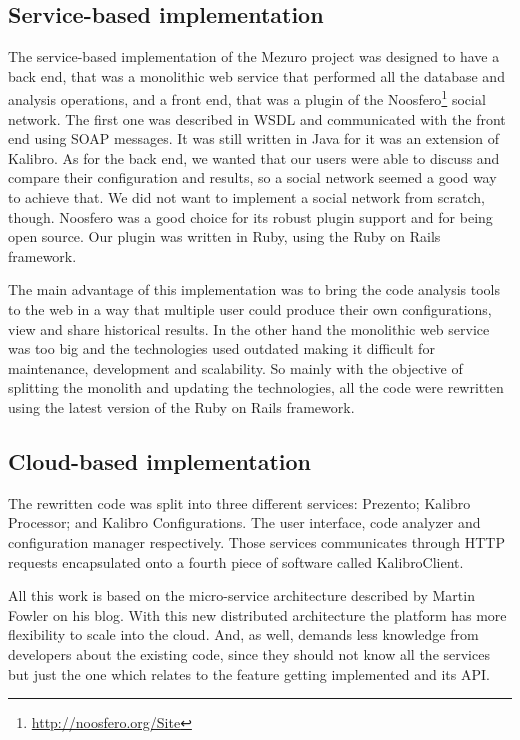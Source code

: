 \subsection{Service-based implementation}
\label{subsec:service-based-implementation}

The service-based implementation of the Mezuro project was designed to have a back end, that was a monolithic web service that performed all the database and analysis operations, and a front end, that was a plugin of the Noosfero\footnote{\url{http://noosfero.org/Site}} social network. The first one was described in WSDL and communicated with the front end using SOAP messages. It was still written in Java for it was an extension of Kalibro. As for the back end, we wanted that our users were able to discuss and compare their configuration and results, so a social network seemed a good way to achieve that. We did not want to implement a social network from scratch, though. Noosfero was a good choice for its robust plugin support and for being open source. Our plugin was written in Ruby, using the Ruby on Rails framework.

The main advantage of this implementation was to bring the code analysis tools to the web in a way that multiple user could produce their own configurations, view and share historical results. In the other hand the monolithic web service was too big and the technologies used outdated making it difficult for maintenance, development and scalability. So mainly with the objective of splitting the monolith and updating the technologies, all the code were rewritten using the latest version of the Ruby on Rails framework.

\subsection{Cloud-based implementation}
\label{subsec:cloud-based-implementation}

The rewritten code was split into three different services: Prezento; Kalibro Processor; and Kalibro Configurations. The user interface, code analyzer and configuration manager respectively. Those services communicates through HTTP requests encapsulated onto a fourth piece of software called KalibroClient.

All this work is based on the micro-service architecture described by Martin Fowler on his blog. With this new distributed architecture the platform has more flexibility to scale into the cloud. And, as well, demands less knowledge from developers about the existing code, since they should not know all the services but just the one which relates to the feature getting implemented and its API.
